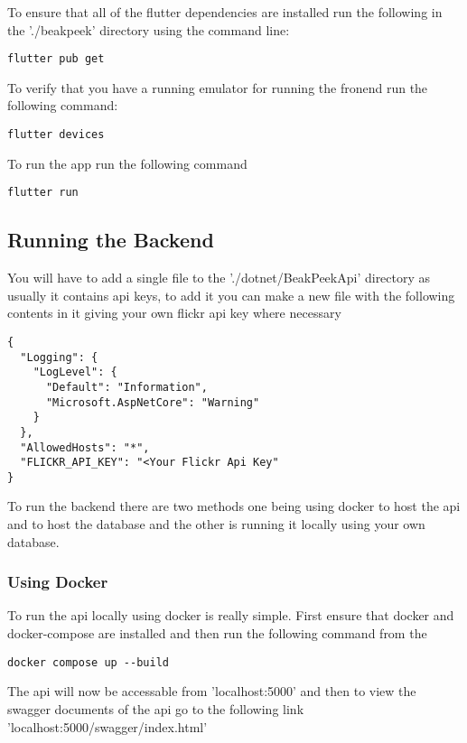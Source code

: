 \documentclass{article}
\begin{document}
To ensure that all of the flutter dependencies are installed run the following
in the './beakpeek' directory using the command line:

\begin{lstlisting}
flutter pub get
\end{lstlisting}

To verify that you have a running emulator for running the fronend run the
following command:

\begin{lstlisting}
flutter devices
\end{lstlisting}

To run the app run the following command

\begin{lstlisting}
flutter run
\end{lstlisting}

\subsection{Running the Backend}

You will have to add a single file to the './dotnet/BeakPeekApi' directory as
usually it contains api keys, to add it you can make a new file with the
following contents in it giving your own flickr api key where necessary

\begin{lstlisting}
{
  "Logging": {
    "LogLevel": {
      "Default": "Information",
      "Microsoft.AspNetCore": "Warning"
    }
  },
  "AllowedHosts": "*",
  "FLICKR_API_KEY": "<Your Flickr Api Key"
}
\end{lstlisting}

To run the backend there are two methods one being using docker to host the api
and to host the database and the other is running it locally using your own
database.

\subsubsection{Using Docker}

To run the api locally using docker is really simple. First ensure that docker
and docker-compose are installed and then run the following command from the

\begin{lstlisting}
docker compose up --build
\end{lstlisting}

The api will now be accessable from 'localhost:5000' and then to view the
swagger documents of the api go to the following link 'localhost:5000/swagger/index.html'
\end{document}
